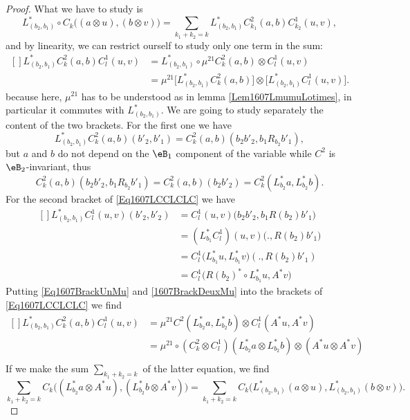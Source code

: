 \begin{proof}
	What we have to study is
	\begin{equation}
		L^*_{(b_2,b_1)}\circ C_k\big( (a\otimes u),(b\otimes v) \big)=\sum_{k_1+k_2=k}L^*_{(b_2,b_1)}C^2_{k_1}(a,b)C^1_{k_2}(u,v),
	\end{equation}
	and by linearity, we can restrict ourself to study only one term in the sum:
	\begin{equation}		\label{Eq1607LCCLCLC}
		\begin{aligned}[]
			L^*_{(b_2,b_1)}C_k^2(a,b)C_l^1(u,v)&=L^*_{(b_2,b_1)}\circ\mu^{21}C^2_k(a,b)\otimes C^1_l(u,v)\\
			&=\mu^{21}\Big[ L^*_{(b_2,b_1)}C^2_k(a,b) \Big]\otimes\Big[ L^*_{(b_2,b_1)}C_l^1(u,v) \Big].
		\end{aligned}
	\end{equation}
	because here, $\mu^{21}$ has to be understood as in lemma \ref{Lem1607LmumuLotimes}, in particular it commutes with $L^*_{(b_2,b_1)}$. We are going to study separately the content of the two brackets. For the first one we have
	\begin{equation}
		L^*_{(b_2,b_1)}C^2_k(a,b)(b'_2,b'_1)=C^2_k(a,b)(b_2b'_2,b_1R_{b_2}b'_1),
	\end{equation}
	but $a$ and $b$ do not depend on the $\eB_1$ component of the variable while $C^2$ is $\eB_2$-invariant, thus
	\begin{equation}	\label{Eq1607BrackUnMu}
		C^2_k(a,b)(b_2b'_2,b_1R_{b_2}b'_1)=C^2_k(a,b)(b_2b'_2)
		=C^2_k(L^*_{b_2}a,L^*_{b_2}b).
	\end{equation}
	For the second bracket of \eqref{Eq1607LCCLCLC} we have
	\begin{equation}		\label{1607BrackDeuxMu}
		\begin{aligned}[]
			L^*_{(b_2,b_1)}C^1_l(u,v)(b'_2,b'_2)&=C^1_l(u,v)\big( b_2b'_2,b_1R(b_2)b'_1 \big)\\
			&=(L^*_{b_1}C^1_l)(u,v)\big( .,R(b_2)b'_1 \big)\\
			&=C^1_l\big( L^*_{b_1}u,L^*_{b_1}v \big)(.,R(b_2)b'_1)\\
			&=C^1_l\big( R(b_2)^*\circ L_{b_1}^*u,A^*v \big)
		\end{aligned}
	\end{equation}
	Putting \eqref{Eq1607BrackUnMu} and \eqref{1607BrackDeuxMu} into the brackets of \eqref{Eq1607LCCLCLC} we find
	\begin{equation}
		\begin{aligned}[]
			L^*_{(b_2,b_1)}C^2_k(a,b)C^1_l(u,v)&=\mu^{21} C^2(L^*_{b_2}a,L^*_{b_2}b)\otimes C^1_l(A^*u,A^*v)\\
			&=\mu^{21}\circ(C^2_k\otimes C^1_l)(L^*_{b_2}a\otimes L^*_{b_2}b)\otimes(A^*u\otimes A^*v)\\
		\end{aligned}
	\end{equation}
	If we make the sum $\sum_{k_1+k_2=k}$ of the latter equation, we find
	\begin{equation}
		\sum_{k_1+k_2=k}C_k\Big( (L^*_{b_2}a\otimes A^*u),(L^*_{b_2}b\otimes A^*v) \Big)=\sum_{k_1+k_2=k}C_k\Big( L^*_{(b_2,b_1)}(a\otimes u),L^*_{(b_2,b_1)}(b\otimes v) \Big).
	\end{equation}
\end{proof}

